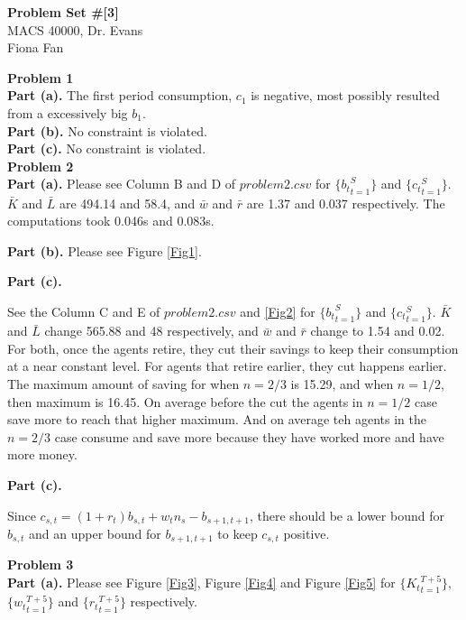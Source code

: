 \documentclass[letterpaper,12pt]{article}
\theoremstyle{definition}
\begin{document}
\begin{flushleft}
  \textbf{\large{Problem Set \#[3]}} \\
  MACS 40000, Dr. Evans \\
  Fiona Fan
\end{flushleft}

\vspace{5mm}

\noindent\textbf{Problem 1}
\\ \textbf{Part (a).} The first period consumption, $c_1$ is negative, most possibly resulted from a excessively big $b_1$.
\\ \textbf{Part (b).} No constraint is violated.
\\ \textbf{Part (c).} No constraint is violated.\\




\noindent\textbf{Problem 2} \\
\textbf{Part (a).} Please see Column B and D of $problem2.csv$ for $\{{b_t}_{t=1}^{S}\}$ and $\{{c_t}_{t=1}^{S}\}$. $\bar{K}$ and $\bar{L}$ are 494.14 and 58.4, and $\bar{w}$ and $\bar{r}$ are 1.37 and 0.037 respectively. The computations took 0.046s and 0.083s.

\textbf{Part (b).} Please see Figure \ref{Fig1}. 

\textbf{Part (c).} 
\par See the Column C and E of $problem2.csv$ and \ref{Fig2} for $\{{b_t}_{t=1}^{S}\}$ and $\{{c_t}_{t=1}^{S}\}$. $\bar{K}$ and $\bar{L}$ change 565.88 and 48 respectively, and $\bar{w}$ and $\bar{r}$ change to 1.54 and 0.02. For both, once the agents retire, they cut their savings to keep their consumption at a near constant level. For agents that retire earlier, they cut happens earlier. The maximum amount of saving for when $n=2/3$ is 15.29, and when $n=1/2$, then maximum is 16.45. On average before the cut the agents in $n=1/2$ case save more to reach that higher maximum. And on average teh agents in the $n=2/3$ case consume and save more because they have worked more and have more money. 

\textbf{Part (c).} 
\par Since $c_{s,t}=(1+r_t)b_{s,t}+w_t n_s-b_{s+1,t+1}$, there should be a lower bound for $b_{s,t}$ and an upper bound for $b_{s+1,t+1}$ to keep $c_{s,t}$ positive.

\noindent\textbf{Problem 3}\\
\textbf{Part (a).} Please see Figure \ref{Fig3}, Figure \ref{Fig4} and Figure \ref{Fig5} for $\{{K_t}_{t=1}^{T+5}\}$, $\{{w_t}_{t=1}^{T+5}\}$ and $\{{r_t}_{t=1}^{T+5}\}$ respectively.
\end{document}
